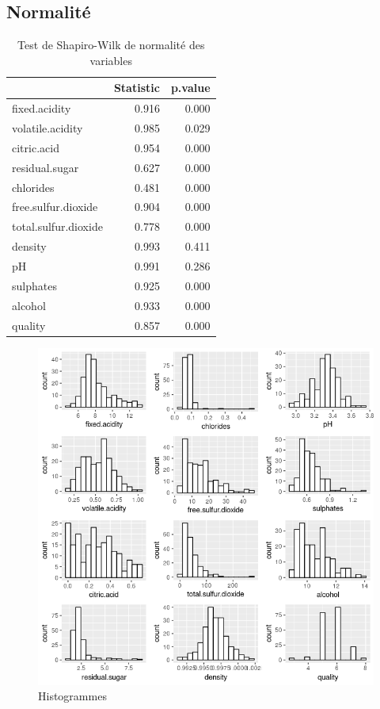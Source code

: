 \documentclass[11pt,a4paper]{article}
\begin{document}
\subsection{Normalité}
\label{sec:normalite}
\begin{table}[h]
	\centering
	\begin{tabular}{lrr}
		\hline
		& Statistic & p.value \\ 
		\hline
		fixed.acidity & 0.916 & 0.000 \\ 
		volatile.acidity & 0.985 & 0.029 \\ 
		citric.acid & 0.954 & 0.000 \\ 
		residual.sugar & 0.627 & 0.000 \\ 
		chlorides & 0.481 & 0.000 \\ 
		free.sulfur.dioxide & 0.904 & 0.000 \\ 
		total.sulfur.dioxide & 0.778 & 0.000 \\ 
		density & 0.993 & 0.411 \\ 
		pH & 0.991 & 0.286 \\ 
		sulphates & 0.925 & 0.000 \\ 
		alcohol & 0.933 & 0.000 \\ 
		quality & 0.857 & 0.000 \\ 
		\hline
	\end{tabular}
\caption{Test de Shapiro-Wilk de normalité des variables}
\label{table:shapiro}
\end{table}


\begin{figure}

\includegraphics[width=\textwidth,keepaspectratio]{"histogram"}

\caption{Histogrammes}
\label{fig:histo}
\end{figure}
\end{document}
